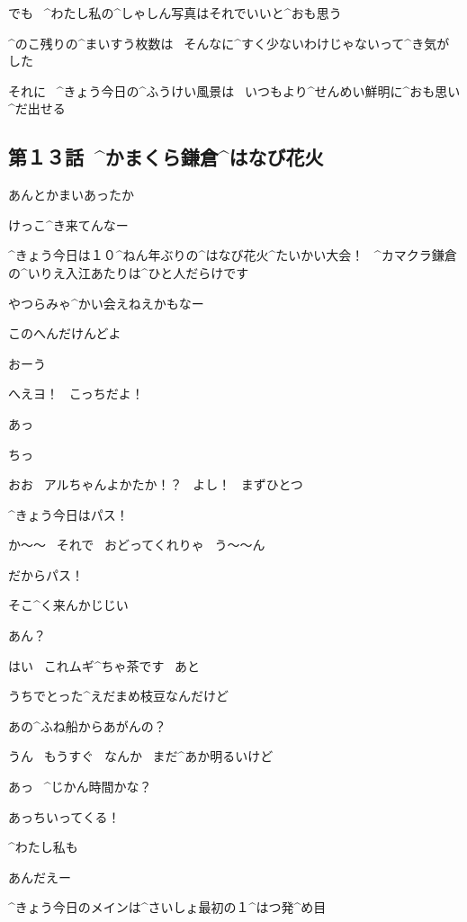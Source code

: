 \Alpha でも
\ ^{わたし}{私}の^{しゃしん}{写真}はそれでいいと^{おも}{思}う

\Alpha ^{のこ}{残}りの^{まいすう}{枚数}は
\ そんなに^{すく}{少}ないわけじゃないって^{き}{気}がした

\Alpha それに
\ ^{きょう}{今日}の^{ふうけい}{風景}は
\ いつもより^{せんめい}{鮮明}に^{おも}{思}い^{だ}{出}せる



\subsection{第１３話\ ^{かまくら}{鎌倉}^{はなび}{花火}}

\page[84]
\Ojisan あんとかまいあったか

\Ojisan けっこ^{き}{来}てんなー

\page[85]
\Alpha ^{きょう}{今日}は１０^{ねん}{年}ぶりの^{はなび}{花火}^{たいかい}{大会}！
\ ^{カマクラ}{鎌倉}の^{いりえ}{入江}あたりは^{ひと}{人}だらけです

\Ojisan やつらみゃ^{かい}{会}えねえかもなー

\Ojisan このへんだけんどよ

\Person おーう

\page[86]
\Person へえヨ！
\ こっちだよ！

\Alpha あっ

\Ojisan ちっ

\Person おお
\ アルちゃんよかたか！？
\ よし！
\ まずひとつ

\Alpha ^{きょう}{今日}はパス！

\Person か〜〜
\ それで
\ おどってくれりゃ
\ う〜〜ん

\Alpha だからパス！

\page[87]
\Person そこ^{く}{来}んかじじい

\Ojisan あん？

\Alpha はい
\ これムギ^{ちゃ}{茶}です
\ あと

\Alpha うちでとった^{えだまめ}{枝豆}なんだけど

\Person あの^{ふね}{船}からあがんの？

\Person うん
\ もうすぐ
\ なんか
\ まだ^{あか}{明}るいけど

\page[88]
\Alpha あっ
\ ^{じかん}{時間}かな？

\Takahiro あっちいってくる！

\Alpha ^{わたし}{私}も

\Person あんだえー

\Alpha ^{きょう}{今日}のメインは^{さいしょ}{最初}の１^{はつ}{発}^{め}{目}

